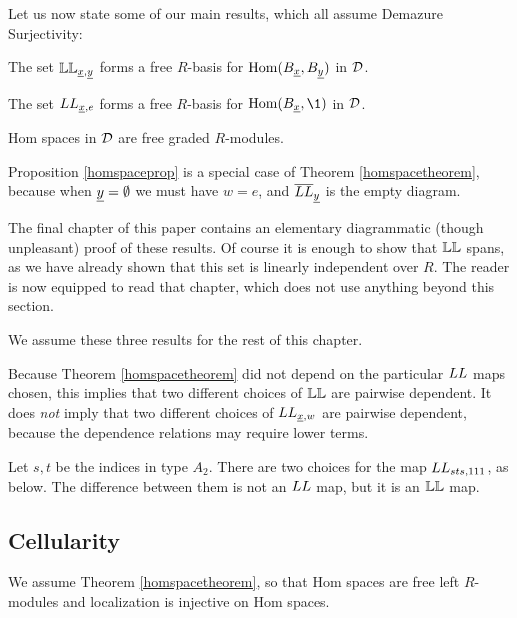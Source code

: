 Let us now state some of our main results, which all assume Demazure Surjectivity:

\begin{thm} \label{homspacetheorem} The set $\mathbb{LL}_{{\underline{x}},{\underline{y}}}$ forms a free $R$-basis for $\operatorname{Hom}(B_{\underline{x}},B_{\underline{y}})$ in ${\mathcal{D}}$. \end{thm}

\begin{prop} \label{homspaceprop} The set $LL_{{\underline{x}},e}$ forms a free $R$-basis for $\Hom(B_{\un{x}},\1)$ in ${\mathcal{D}}$. \end{prop}

\begin{cor} Hom spaces in ${\mathcal{D}}$ are free graded $R$-modules. \end{cor}

\begin{remark} Proposition \ref{homspaceprop} is a special case of Theorem \ref{homspacetheorem}, because when ${\underline{y}}=\emptyset$ we must have $w=e$, and $\overline{LL}_{{\underline{y}}}$ is the empty
diagram.\end{remark}

The final chapter of this paper contains an elementary diagrammatic (though unpleasant) proof of these results.  Of course it is enough to show that $\mathbb{LL}$ spans, as we have already shown that this set is linearly independent over $R$. The reader is now equipped to read that chapter, which does not use anything beyond this
section.

We assume these three results for the rest of this chapter.

Because Theorem \ref{homspacetheorem} did not depend on the particular $LL$ maps chosen, this implies that two different choices of $\mathbb{LL}$ are pairwise dependent. It does \emph{not} imply
that two different choices of $LL_{{\underline{x}},w}$ are pairwise dependent, because the dependence relations may require lower terms.

\begin{ex} Let $s,t$ be the indices in type $A_2$. There are two choices for the map $LL_{sts,111}$, as below. The difference between them is not an $LL$ map, but it is an $\mathbb{LL}$ map.
 \end{ex}

\subsection{Cellularity}

We assume Theorem \ref{homspacetheorem}, so that Hom spaces are free left $R$-modules and localization is injective on Hom spaces.

